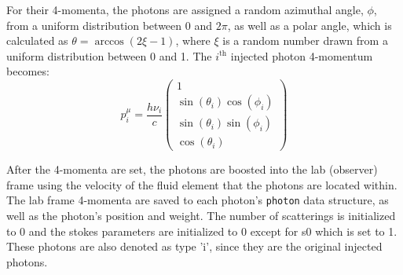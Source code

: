 \documentclass[12pt,a4paper]{article}
\begin{document}
For their 4-momenta, the photons are assigned a random azimuthal angle, $\phi$, from a uniform distribution between $0$ and $2\pi$, as well as a polar angle, which is calculated as $\theta=\arccos(2\xi-1)$, where $\xi$ is a random number drawn from a uniform distribution between 0 and 1. The $i^\mathrm{th}$ injected photon 4-momentum becomes:
\[
p^\mu_i=\frac{h\nu_i}{c}\begin{pmatrix}
1 \\ \sin(\theta_i) \cos(\phi_i) \\ \sin(\theta_i) \sin(\phi_i) \\ \cos(\theta_i)
\end{pmatrix}
\]

After the 4-momenta are set, the photons are boosted into the lab (observer) frame using the velocity of the fluid element that the photons are located within. The lab frame 4-momenta are saved to each photon's \texttt{photon} data structure, as well as the photon's position and weight. The number of scatterings is initialized to 0 and the stokes parameters are initialized to 0 except for s0 which is set to 1. These photons are also denoted as type 'i', since they are the original injected photons.
\end{document}
